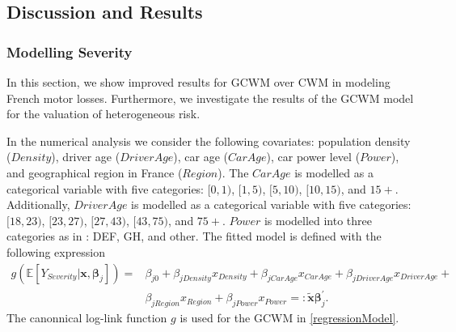 \documentclass[12pt,letterpaper]{article}
\numberwithin{equation}{section}
\numberwithin{equation}{section}
\numberwithin{equation}{section}
\newcommand{\xTilda}{\tilde{\bm{x}}}
\begin{document}
\subsection{Discussion and Results}
\subsubsection{Modelling Severity}
In this section, we show improved results for GCWM  over CWM in modeling French motor losses. Furthermore, we investigate the results of the GCWM model for the valuation of heterogeneous risk. 

In the numerical analysis we consider the following covariates: population density ($Density$), driver age ($DriverAge$), car age ($CarAge$), car power level ($Power$),  and geographical region in France ($Region$). %
The
$CarAge$ is modelled as a categorical variable with five categories: $[0,1)$, $[1,5)$, $[5,10)$, $[10,15)$, and $15+$. Additionally, $DriverAge$ is modelled as a categorical variable with five categories: $[18,23)$, $[23,27)$, $[27,43)$, $[43,75)$, and $75+$. $Power$ is modelled into three categories as in \cite{Charpentier:2014}:
DEF, GH, and other. The fitted model is defined with the following expression
\begin{align}
g(\mathbb{E}\left[Y_{Severity}|\bm{x},  \bm{\beta}_j  \right]) = 
 & \beta_{j0} +  \beta_{jDensity}x_{Density}+ \beta_{jCar Age} x_{Car Age}+ \beta_{jDriver Age} x_{Driver Age} + \nonumber \\ &  \beta_{jRegion} x_{Region} + \beta_{jPower} x_{Power} \label{regressionModel}  =: \bm{\xTilda} \bm{\beta}_j^{'}.
\end{align}
The canonnical log-link function $g$ is used for the GCWM in \eqref{regressionModel}. 
\end{document}
